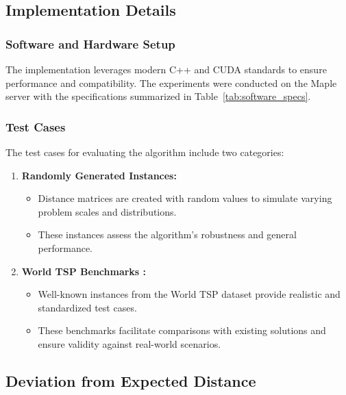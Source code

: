 \documentclass[conference]{IEEEtran}
\begin{document}
\subsection{Implementation Details}

\subsubsection{Software and Hardware Setup}

The implementation leverages modern C++ and CUDA standards to ensure performance and compatibility. The experiments were conducted on the Maple server with the specifications summarized in Table~\ref{tab:software_specs}.




\subsubsection{Test Cases}

The test cases for evaluating the algorithm include two categories:
\begin{enumerate}
    \item \textbf{Randomly Generated Instances:}
    \begin{itemize}
        \item Distance matrices are created with random values to simulate varying problem scales and distributions.
        \item These instances assess the algorithm’s robustness and general performance.
    \end{itemize}
    \item \textbf{World TSP Benchmarks \cite{worldtsp}:}
    \begin{itemize}
        \item Well-known instances from the World TSP dataset provide realistic and standardized test cases.
        \item These benchmarks facilitate comparisons with existing solutions and ensure validity against real-world scenarios.
    \end{itemize}
\end{enumerate}

\renewcommand{\arraystretch}{1.5}


\subsection{Deviation from Expected Distance}

\end{document}
